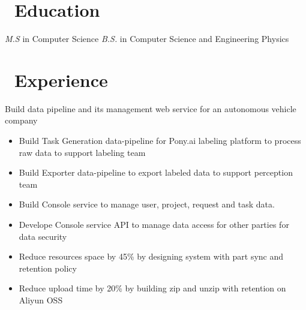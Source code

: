 \documentclass{resume}
\begin{document}



\section{\faGraduationCap\ Education}
\textit{M.S} in Computer Science
\textit{B.S.} in Computer Science and Engineering Physics

\section{\faUsers\ Experience}
Build data pipeline and its management web service for an autonomous vehicle company
\begin{itemize}
  \item Build Task Generation data-pipeline for Pony.ai labeling platform to process raw data to support labeling team
  \item Build Exporter data-pipeline to export labeled data to support perception team 
  \item Build Console service to manage user, project, request and task data. 
  \item Develope Console service API to manage data access for other parties for data security
  \item Reduce resources space by 45\% by designing system with part sync and retention policy
  \item Reduce upload time by 20\% by building zip and unzip with retention on Aliyun OSS 
\end{itemize}
\end{document}
